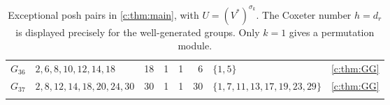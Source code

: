 \documentclass[11pt]{amsart}
\theoremstyle{definition}
\begin{document}
\begin{longtable}{@{}lL{.24\textwidth}rrrrL{.26\textwidth}L{.14\textwidth}@{}}
$G_{36}$ & $2,\allowbreak 6,\allowbreak 8,\allowbreak 10,\allowbreak 12,\allowbreak 14,\allowbreak 18$ & 18 & 1 & 1 & 6 & $\{1,\allowbreak 5\}$ & \cref{c:thm:GG} \\
\midrule[.25pt]
$G_{37}$ & $2,\allowbreak 8,\allowbreak 12,\allowbreak 14,\allowbreak 18,\allowbreak 20,\allowbreak 24,\allowbreak 30$ & 30 & 1 & 1 & 30 & $\{1,\allowbreak 7,\allowbreak 11,\allowbreak 13,\allowbreak 17,\allowbreak 19,\allowbreak 23,\allowbreak 29\}$ & \cref{c:thm:GG} \\
\bottomrule
\caption{Exceptional posh pairs in \cref{c:thm:main}, with $U=(V^*)^{\sigma_k}$. The Coxeter number $h=d_r$ is displayed precisely for the well-generated groups. Only $k=1$ gives a permutation module.}\label{c:tab:exceptional}\\
\end{longtable}
\endgroup
\endgroup
\begingroup\small%
\end{document}
